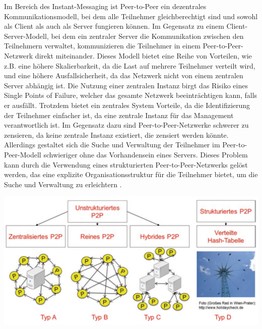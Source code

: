 Im Bereich des Instant-Messaging ist Peer-to-Peer ein dezentrales Kommunikationsmodell, bei dem alle Teilnehmer gleichberechtigt sind und sowohl als Client als auch als Server fungieren können. Im Gegensatz zu einem Client-Server-Modell, bei dem ein zentraler Server die Kommunikation zwischen den Teilnehmern verwaltet, kommunizieren die Teilnehmer in einem Peer-to-Peer-Netzwerk direkt miteinander. Dieses Modell bietet eine Reihe von Vorteilen, wie z.B. eine höhere Skalierbarkeit, da die Last auf mehrere Teilnehmer verteilt wird, und eine höhere Ausfallsicherheit, da das Netzwerk nicht von einem zentralen Server abhängig ist. Die Nutzung einer zentralen Instanz birgt das Risiko eines Single Points of Failure, welcher das gesamte Netzwerk beeinträchtigen kann, falls er ausfällt. Trotzdem bietet ein zentrales System Vorteile, da die Identifizierung der Teilnehmer einfacher ist, da eine zentrale Instanz für das Management verantwortlich ist. Im Gegensatz dazu sind Peer-to-Peer-Netzwerke schwerer zu zensieren, da keine zentrale Instanz existiert, die zensiert werden könnte. Allerdings gestaltet sich die Suche und Verwaltung der Teilnehmer im Peer-to-Peer-Modell schwieriger ohne das Vorhandensein eines Servers. Dieses Problem kann durch die Verwendung eines strukturierten Peer-to-Peer-Netzwerks gelöst werden, das eine explizite Organisationsstruktur für die Teilnehmer bietet, um die Suche und Verwaltung zu erleichtern \parencite{Luntovskyy_ModRechnernetze}.

\begin{center}
    \captionsetup{type=figure}
    \includegraphics[width=1\linewidth]{images/peer_to_peer_typen.png}
    \label{p2p_typen}
\end{center}

